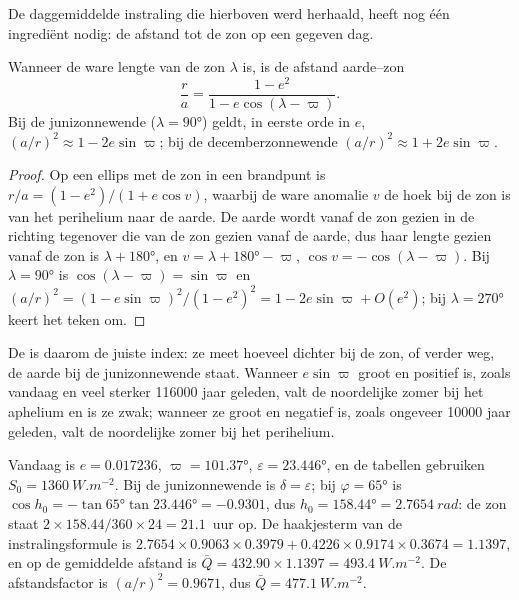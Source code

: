 De daggemiddelde instraling die hierboven werd herhaald, heeft nog één ingrediënt nodig: de afstand tot de zon op een
gegeven dag.

\begin{proposition}\label{prop:b2:orbital-forcing:distance}
Wanneer de ware lengte van de zon $\lambda$ is, is de afstand aarde--zon
\[
  \frac{r}{a} = \frac{1 - e^2}{1 - e\cos(\lambda - \varpi)} .
\]
Bij de junizonnewende ($\lambda = \ang{90}$) geldt, in eerste orde in $e$,
$(a/r)^2 \approx 1 - 2e\sin\varpi$; bij de decemberzonnewende $(a/r)^2 \approx 1 + 2e\sin\varpi$.
\end{proposition}

\begin{proof}
Op een ellips met de zon in een brandpunt is $r/a = (1 - e^2)/(1 + e\cos v)$, waarbij de ware anomalie $v$
de hoek bij de zon is van het perihelium naar de aarde. De aarde wordt vanaf de zon gezien in de
richting tegenover die van de zon gezien vanaf de aarde, dus haar lengte gezien vanaf de zon is
$\lambda + \ang{180}$, en $v = \lambda + \ang{180} - \varpi$, $\cos v = -\cos(\lambda - \varpi)$.
Bij $\lambda = \ang{90}$ is $\cos(\lambda - \varpi) = \sin\varpi$ en $(a/r)^2 = (1 -
e\sin\varpi)^2/(1 - e^2)^2 = 1 - 2e\sin\varpi + O(e^2)$; bij $\lambda = \ang{270}$ keert het teken om.
\end{proof}

De  is daarom de juiste index: ze meet hoeveel dichter bij de zon, of
verder weg, de aarde bij de junizonnewende staat. Wanneer $e\sin\varpi$ groot en positief is, zoals vandaag en
veel sterker \num{116000} jaar geleden, valt de noordelijke zomer bij het aphelium en is ze zwak; wanneer ze
groot en negatief is, zoals ongeveer \num{10000} jaar geleden, valt de noordelijke zomer bij het perihelium.

\begin{example}\label{ex:b2:orbital-forcing:today}
Vandaag is $e = 0.017236$, $\varpi = \ang{101.37}$, $\varepsilon = \ang{23.446}$, en de tabellen gebruiken
$S_0 = \qty{1360}{W.m^{-2}}$. Bij de junizonnewende is $\delta = \varepsilon$; bij $\varphi =
\ang{65}$ is $\cos h_0 = -\tan\ang{65}\tan\ang{23.446} = -0.9301$, dus $h_0 = \ang{158.44} =
\qty{2.7654}{rad}$: de zon staat $2 \times 158.44/360 \times 24 = 21.1$~uur op. De haakjesterm van
de instralingsformule is $2.7654 \times 0.9063 \times 0.3979 + 0.4226 \times 0.9174 \times 0.3674 =
1.1397$, en op de gemiddelde afstand is $\bar Q = 432.90 \times 1.1397 = \qty{493.4}{W.m^{-2}}$. De
afstandsfactor is $(a/r)^2 = 0.9671$, dus $\bar Q = \qty{477.1}{W.m^{-2}}$.
\end{example}

